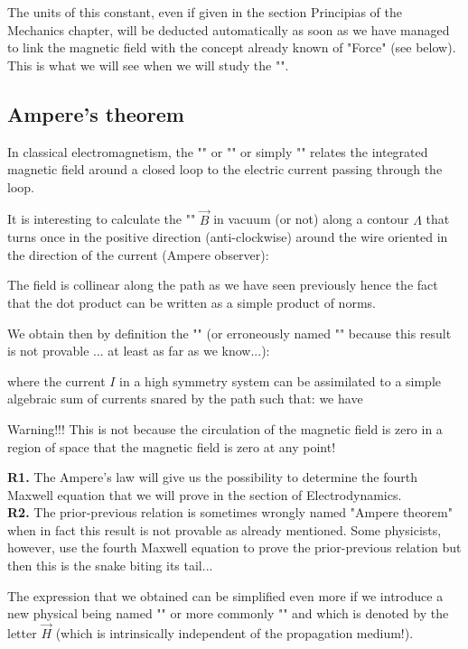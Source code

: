 	The units of this constant, even if given in the section Principias of the Mechanics chapter, will be deducted automatically as soon as we have managed to link the magnetic field with the concept already known of "Force" (see below). This is what we will see when we will study the "".
	
	\subsection{Ampere's theorem }
	In classical electromagnetism, the "" or "" or simply "" relates the integrated magnetic field around a closed loop to the electric current passing through the loop.
	
	It is interesting to calculate the "" $\vec{B}$ in vacuum (or not) along a contour $\Lambda$ that turns once in the positive direction (anti-clockwise) around the wire oriented in the direction of the current (Ampere observer):
	
	
	\begin{tcolorbox}[title=Remark,colframe=black,arc=10pt]
	The field is collinear along the path as we have seen previously hence the fact that the dot product can be written as a simple product of norms.
	\end{tcolorbox}
	We obtain then by definition the "" (or erroneously named "" because this result is not provable ... at least as far as we know...):
	
	where the current $I$ in a high symmetry system can be assimilated to a simple algebraic sum of currents snared by the path such that: we have
	
	Warning!!! This is not because the circulation of the magnetic field is zero in a region of space that the magnetic field is zero at any point!
	\begin{tcolorbox}[title=Remarks,colframe=black,arc=10pt]
	\textbf{R1.} The Ampere's law will give us the possibility to determine the fourth Maxwell equation that we will prove in the section of Electrodynamics.\\
	
	\textbf{R2.} The prior-previous relation is sometimes wrongly named "Ampere theorem" when in fact this result is not provable as already mentioned. Some physicists, however, use the fourth Maxwell equation to prove the prior-previous relation but then this is the snake biting its tail...
	\end{tcolorbox}
	The expression that we obtained can be simplified even more if we introduce a new physical being named "" or more commonly "" and which is denoted by the letter $\vec{H}$ (which is intrinsically independent of the propagation medium!).
	
